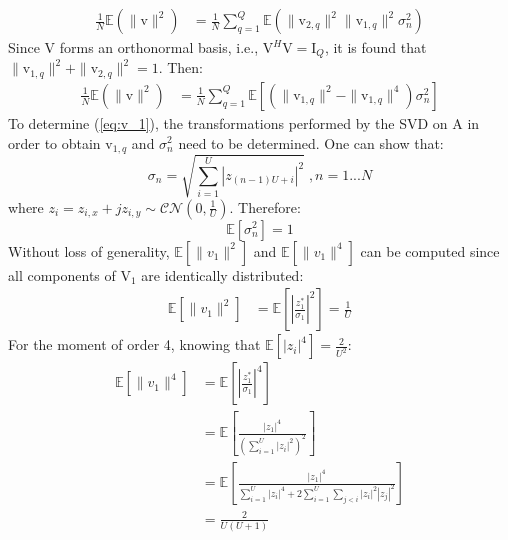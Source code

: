 \documentclass[journal,comsoc]{IEEEtran}
\newcommand{\vect}[1]{\boldsymbol{\mathrm{#1}}}
\newcommand{\mat}[1]{\boldsymbol{\mathrm{#1}}}
\begin{document}
\begin{align}
\frac{1}{N}\mathbb{E}\left(\|\vect{v}\|^2\right) &=\frac{1}{N}\sum_{q=1}^Q \mathbb{E} \left( \| \vect{v}_{2,q}\|^2 \| \vect{v}_{1,q}\|^2 \sigma_n^2  \right)
\end{align}
Since $\mat{V}$ forms an orthonormal basis, i.e., $\mat{V}^H \mat{V} = \mat{I}_Q$, it is found that $ \| \vect{v}_{1,q}\|^2 +  \| \vect{v}_{2,q}\|^2 = 1$. Then:
\begin{align}
\frac{1}{N}\mathbb{E}\left(\|\vect{v}\|^2\right) &=\frac{1}{N}\sum_{q=1}^Q \mathbb{E} \left[ \left( \| \vect{v}_{1,q}\|^2 - \| \vect{v}_{1,q}\|^4 \right) \sigma_n^2  \right]
\label{eq:v_1}
\end{align}
To determine (\ref{eq:v_1}), the transformations performed by the SVD on $\mat{A}$ in order to obtain $\vect{v}_{1,q}$ and $\sigma^2_n$ need to be determined. One can show that:
\begin{equation}
	\sigma_n = \sqrt{\sum_{i=1}^{U} \left| z_{(n-1)U+i}\right|^2} \; , n = 1...N
\end{equation}
where $z_i  = z_{i,x} + jz_{i,y} \sim \mathcal{CN}(0,\frac{1}{U})$. Therefore:
\begin{equation}
	\mathbb{E} \left[\sigma_n^2 \right] = 1
\end{equation}
Without loss of generality, $\mathbb{E} \left[ \| v_1\|^2 \right]$ and $\mathbb{E} \left[ \| v_1\|^4 \right]$  can be computed since all components of $\mat{V}_1$ are identically distributed:
\begin{equation}
	\begin{split}
	\mathbb{E} \left[ \| v_1\|^2 \right] &= \mathbb{E}\left[ \left| \frac{z_1^*}{\sigma_1}\right|^2\right]  = \frac{1}{U}
	\end{split}
\end{equation}
For the moment of order 4, knowing that $\mathbb{E}\left[ \left| z_i \right|^4\right] = \frac{2}{U^2}$:
\begin{equation}
	\begin{split}
	\mathbb{E} \left[ \| v_1\|^4 \right] &= \mathbb{E}\left[ \left| \frac{z_1^*}{\sigma_1}\right|^4\right] \\
	&=  \mathbb{E} \left[   \frac{\left| z_1 \right|^4 }{  \left( \sum_{i=1}^{U} \left| z_i\right|^2 \right)^2 }  \right] \label{eq:moment_4_1} \\
	&= \mathbb{E} \left[   \frac{\left| z_1 \right|^4 }{  \sum_{i=1}^{U} \left| z_i\right|^4 + 2 \sum_{i=1}^{U} \sum_{j<i} \left|z_i\right|^2 \left|z_j\right|^2 }  \right]\\
	&= \frac{2}{U(U+1)}
	\end{split}
\end{equation}
\end{document}
